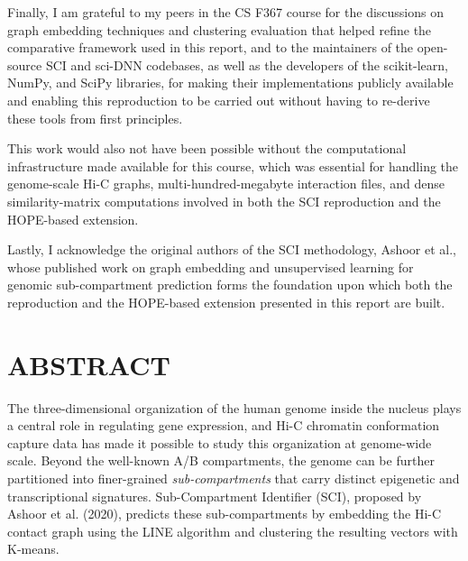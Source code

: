 \documentclass[12pt]{article}
\begin{document}
Finally, I am grateful to my peers in the CS F367 course for the discussions on graph embedding
techniques and clustering evaluation that helped refine the comparative framework used in this
report, and to the maintainers of the open-source SCI and sci-DNN codebases, as well as the
developers of the scikit-learn, NumPy, and SciPy libraries, for making their implementations
publicly available and enabling this reproduction to be carried out without having to re-derive
these tools from first principles.

This work would also not have been possible without the computational infrastructure made
available for this course, which was essential for handling the genome-scale Hi-C graphs,
multi-hundred-megabyte interaction files, and dense similarity-matrix computations involved
in both the SCI reproduction and the HOPE-based extension.

Lastly, I acknowledge the original authors of the SCI methodology, Ashoor et al., whose
published work on graph embedding and unsupervised learning for genomic sub-compartment
prediction forms the foundation upon which both the reproduction and the HOPE-based extension
presented in this report are built.

\section*{ABSTRACT}

The three-dimensional organization of the human genome inside the nucleus plays a central role
in regulating gene expression, and Hi-C chromatin conformation capture data has made it possible
to study this organization at genome-wide scale. Beyond the well-known A/B compartments, the
genome can be further partitioned into finer-grained \textit{sub-compartments} that carry distinct
epigenetic and transcriptional signatures. Sub-Compartment Identifier (SCI), proposed by
Ashoor et al. (2020), predicts these sub-compartments by embedding the Hi-C contact graph using
the LINE algorithm and clustering the resulting vectors with K-means.
\end{document}
